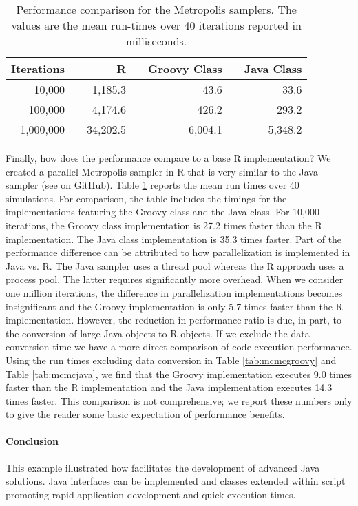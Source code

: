 \begin{table}[h!]
\centering
\caption{Performance comparison for the Metropolis samplers. The values are the mean run-times over 40 iterations reported in milliseconds.}
\begin{tabular}{rrrrrrr}
\toprule
Iterations & & R        & & Groovy Class & & Java Class \\ \midrule
10,000     & & 1,185.3  & & 43.6         & & 33.6       \\
100,000    & & 4,174.6  & & 426.2        & & 293.2      \\
1,000,000  & & 34,202.5 & & 6,004.1      & & 5,348.2    \\ \bottomrule
\end{tabular}
\label{tab:mcmccomparison}
\end{table}

Finally, how does the performance compare to a base R implementation? We created a parallel Metropolis sampler in R that is very similar to the Java sampler (see  on GitHub). Table \ref{tab:mcmccomparison} reports the mean run times over 40 simulations. For comparison, the table includes the timings for the implementations featuring the Groovy class and the Java class. For 10,000 iterations, the Groovy class implementation is 27.2 times faster than the R implementation. The Java class implementation is 35.3 times faster. Part of the performance difference can be attributed to how parallelization is implemented in Java vs. R. The Java sampler uses a thread pool whereas the R approach uses a process pool. The latter requires significantly more overhead. When we consider one million iterations, the difference in parallelization implementations becomes insignificant and the Groovy implementation is only 5.7 times faster than the R implementation. However, the reduction in performance ratio is due, in part, to the conversion of large Java objects to R objects. If we exclude the data conversion time we have a more direct comparison of code execution performance. Using the run times excluding data conversion in Table \ref{tab:mcmcgroovy} and Table \ref{tab:mcmcjava}, we find that the Groovy implementation executes 9.0 times faster than the R implementation and the Java implementation executes 14.3 times faster. This comparison is not comprehensive; we report these numbers only to give the reader some basic expectation of performance benefits.

\paragraph{Conclusion} This example illustrated how  facilitates the development of advanced Java solutions. Java interfaces can be implemented and classes extended within script promoting rapid application development and quick execution times.

